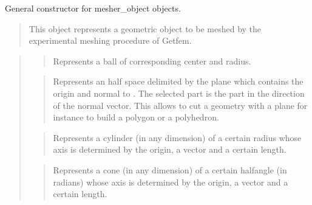\documentclass[a4paper,11pt,english]{sphinxmanual}
\begin{document}

General constructor for mesher\_object objects.
\begin{quote}

This object represents a geometric object to be meshed by the
experimental meshing procedure of Getfem.
\end{quote}

\begin{quote}

\begin{quote}

Represents a ball of corresponding center and radius.
\end{quote}

\begin{quote}

Represents an half space delimited by the plane which contains the
origin and normal to . The selected part is the part
in the direction of the normal vector. This allows to cut a geometry
with a plane for instance to build a polygon or a polyhedron.
\end{quote}

\begin{quote}

Represents a cylinder (in any dimension) of a certain radius whose axis
is determined by the origin, a vector  and a certain length.
\end{quote}

\begin{quote}

Represents a cone (in any dimension) of a certain half\sphinxhyphen{}angle (in radians)
whose axis is determined by the origin, a vector  and a certain length.
\end{quote}

\begin{quote}


\end{quote}
\end{quote}
\end{document}
